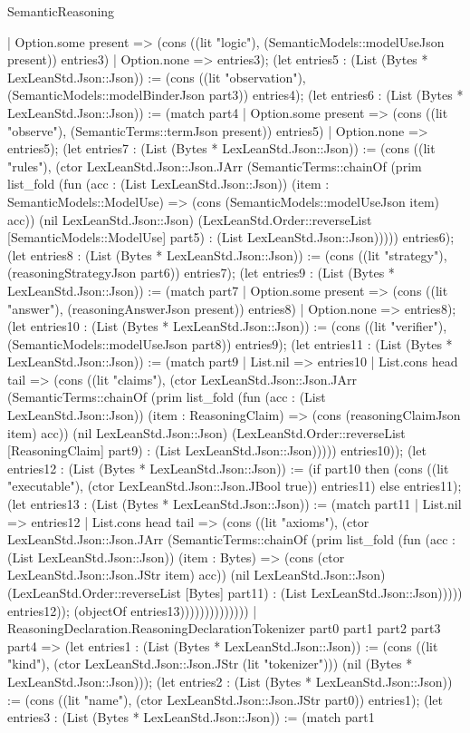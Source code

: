 \begin{lexlean}{SemanticReasoning}
\begin{semanticmodule}
{      | Option.some present => (cons ((lit "logic"), (SemanticModels::modelUseJson present)) entries3)
      | Option.none => entries3); (let entries5 : (List (Bytes * LexLeanStd.Json::Json)) := (cons ((lit "observation"), (SemanticModels::modelBinderJson part3)) entries4); (let entries6 : (List (Bytes * LexLeanStd.Json::Json)) := (match part4
      | Option.some present => (cons ((lit "observe"), (SemanticTerms::termJson present)) entries5)
      | Option.none => entries5); (let entries7 : (List (Bytes * LexLeanStd.Json::Json)) := (cons ((lit "rules"), (ctor LexLeanStd.Json::Json.JArr (SemanticTerms::chainOf (prim list_fold (fun (acc : (List LexLeanStd.Json::Json)) (item : SemanticModels::ModelUse) => (cons (SemanticModels::modelUseJson item) acc)) (nil LexLeanStd.Json::Json) (LexLeanStd.Order::reverseList [SemanticModels::ModelUse] part5) : (List LexLeanStd.Json::Json))))) entries6); (let entries8 : (List (Bytes * LexLeanStd.Json::Json)) := (cons ((lit "strategy"), (reasoningStrategyJson part6)) entries7); (let entries9 : (List (Bytes * LexLeanStd.Json::Json)) := (match part7
      | Option.some present => (cons ((lit "answer"), (reasoningAnswerJson present)) entries8)
      | Option.none => entries8); (let entries10 : (List (Bytes * LexLeanStd.Json::Json)) := (cons ((lit "verifier"), (SemanticModels::modelUseJson part8)) entries9); (let entries11 : (List (Bytes * LexLeanStd.Json::Json)) := (match part9
      | List.nil => entries10
      | List.cons head tail => (cons ((lit "claims"), (ctor LexLeanStd.Json::Json.JArr (SemanticTerms::chainOf (prim list_fold (fun (acc : (List LexLeanStd.Json::Json)) (item : ReasoningClaim) => (cons (reasoningClaimJson item) acc)) (nil LexLeanStd.Json::Json) (LexLeanStd.Order::reverseList [ReasoningClaim] part9) : (List LexLeanStd.Json::Json))))) entries10)); (let entries12 : (List (Bytes * LexLeanStd.Json::Json)) := (if part10 then (cons ((lit "executable"), (ctor LexLeanStd.Json::Json.JBool true)) entries11) else entries11); (let entries13 : (List (Bytes * LexLeanStd.Json::Json)) := (match part11
      | List.nil => entries12
      | List.cons head tail => (cons ((lit "axioms"), (ctor LexLeanStd.Json::Json.JArr (SemanticTerms::chainOf (prim list_fold (fun (acc : (List LexLeanStd.Json::Json)) (item : Bytes) => (cons (ctor LexLeanStd.Json::Json.JStr item) acc)) (nil LexLeanStd.Json::Json) (LexLeanStd.Order::reverseList [Bytes] part11) : (List LexLeanStd.Json::Json))))) entries12)); (objectOf entries13))))))))))))))
    | ReasoningDeclaration.ReasoningDeclarationTokenizer part0 part1 part2 part3 part4 => (let entries1 : (List (Bytes * LexLeanStd.Json::Json)) := (cons ((lit "kind"), (ctor LexLeanStd.Json::Json.JStr (lit "tokenizer"))) (nil (Bytes * LexLeanStd.Json::Json))); (let entries2 : (List (Bytes * LexLeanStd.Json::Json)) := (cons ((lit "name"), (ctor LexLeanStd.Json::Json.JStr part0)) entries1); (let entries3 : (List (Bytes * LexLeanStd.Json::Json)) := (match part1
}
\end{semanticmodule}
\end{lexlean}
